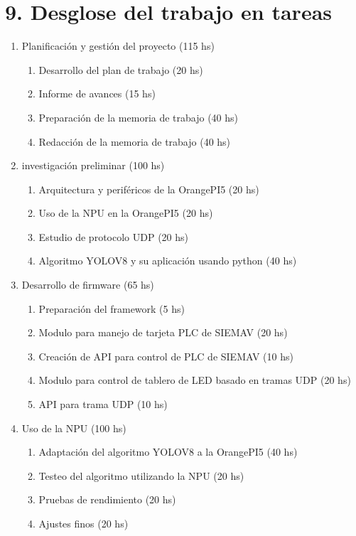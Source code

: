 \documentclass[
11pt, %
]{charter}
\begin{document}
\section{9. Desglose del trabajo en tareas}
\label{sec:wbs}

\begin{enumerate}
\item Planificación y gestión del proyecto (115 hs)
	\begin{enumerate}
	\item Desarrollo del plan de trabajo (20 hs)
	\item Informe de avances (15 hs)
	\item Preparación de la memoria de trabajo (40 hs)
	\item Redacción de la memoria de trabajo (40 hs)
	\end{enumerate}
\item investigación preliminar (100 hs)
	\begin{enumerate}
	\item Arquitectura y periféricos de la OrangePI5 (20 hs)
	\item Uso de la NPU en la OrangePI5 (20 hs)
	\item Estudio de protocolo UDP (20 hs)
	\item Algoritmo YOLOV8 y su aplicación usando python (40 hs)
	\end{enumerate}
\item Desarrollo de firmware (65 hs)
	\begin{enumerate}
	\item Preparación del framework (5 hs)
	\item Modulo para manejo de tarjeta PLC de SIEMAV (20 hs)
	\item Creación de API para control de PLC de SIEMAV (10 hs)
	\item Modulo para control de tablero de LED basado en tramas UDP (20 hs)
	\item API para trama UDP (10 hs)
	\end{enumerate}
\item Uso de la NPU (100 hs)
	\begin{enumerate}
	\item Adaptación del algoritmo YOLOV8 a la OrangePI5 (40 hs)
	\item Testeo del algoritmo utilizando la NPU (20 hs)
	\item Pruebas de rendimiento  (20 hs)
	\item Ajustes finos (20 hs)
	\end{enumerate}

\end{enumerate}
\end{document}
